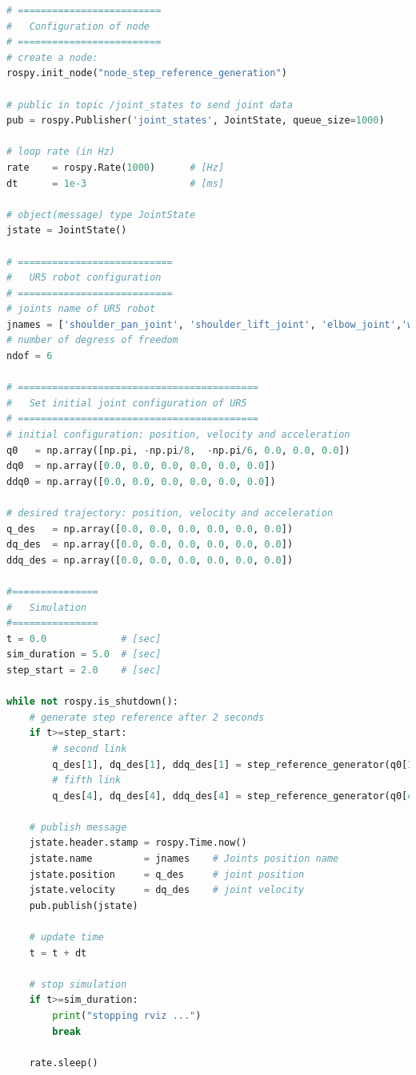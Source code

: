 \begin{lstlisting}[language=Python, caption={Rosnode to move the second and fifth joint of UR5 robot with the requirement motion of activity 1.2.}, label={lst:rosnode_step_reference_generator}]
# =========================
#   Configuration of node
# =========================
# create a node: 
rospy.init_node("node_step_reference_generation")

# public in topic /joint_states	to send joint data	
pub = rospy.Publisher('joint_states', JointState, queue_size=1000)

# loop rate (in Hz)
rate 	= rospy.Rate(1000)		# [Hz]
dt 		= 1e-3					# [ms]

# object(message) type JointState
jstate = JointState()

# ===========================
#   UR5 robot configuration
# ===========================
# joints name of UR5 robot
jnames = ['shoulder_pan_joint', 'shoulder_lift_joint', 'elbow_joint','wrist_1_joint', 'wrist_2_joint', 'wrist_3_joint']
# number of degress of freedom
ndof = 6

# ==========================================
#   Set initial joint configuration of UR5
# ==========================================
# initial configuration: position, velocity and acceleration 
q0   = np.array([np.pi, -np.pi/8,  -np.pi/6, 0.0, 0.0, 0.0])
dq0  = np.array([0.0, 0.0, 0.0, 0.0, 0.0, 0.0])
ddq0 = np.array([0.0, 0.0, 0.0, 0.0, 0.0, 0.0]) 

# desired trajectory: position, velocity and acceleration
q_des   = np.array([0.0, 0.0, 0.0, 0.0, 0.0, 0.0])
dq_des  = np.array([0.0, 0.0, 0.0, 0.0, 0.0, 0.0])
ddq_des = np.array([0.0, 0.0, 0.0, 0.0, 0.0, 0.0])

#===============
#   Simulation
#===============
t = 0.0             # [sec] 
sim_duration = 5.0  # [sec]
step_start = 2.0    # [sec]

while not rospy.is_shutdown():
    # generate step reference after 2 seconds
    if t>=step_start:
        # second link
        q_des[1], dq_des[1], ddq_des[1] = step_reference_generator(q0[1],-0.4)
        # fifth link
        q_des[4], dq_des[4], ddq_des[4] = step_reference_generator(q0[4], 0.5)

    # publish message
    jstate.header.stamp = rospy.Time.now()
    jstate.name 		= jnames    # Joints position name
    jstate.position 	= q_des     # joint position
    jstate.velocity 	= dq_des    # joint velocity
    pub.publish(jstate)

    # update time
    t = t + dt
    
    # stop simulation    
    if t>=sim_duration:
        print("stopping rviz ...")
        break

    rate.sleep()

\end{lstlisting}


